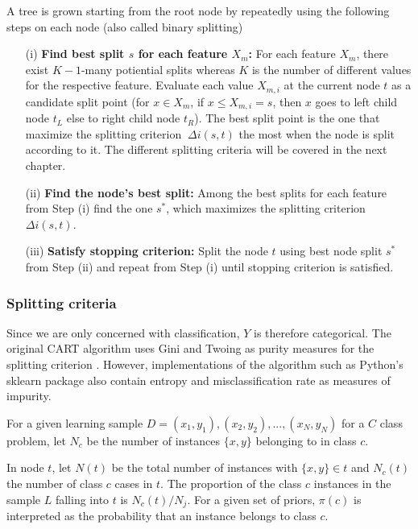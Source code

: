 A tree is grown starting from the root node by repeatedly using the following steps on each
node (also called binary splitting)

\begin{itemize}
    \item[(i)] \textbf{Find best split \(s\) for each feature \(X_{m}\):}
    For each feature \(X_{m}\), there exist \(K-1\)-many potiential splits whereas \(K\) is the number of different values for the respective feature.
    Evaluate each value \(X_{m,i}\) at the current node \(t\) as a candidate split point (for \(x \in X_{m}\), if \(x \leq X_{m,i}=s\),
    then \(x\) goes to left child node \(t_{L}\) else to right child node \(t_{R}\)).
    The best split point is the one that maximize the splitting criterion \(\ \Delta i(s,t) \) the most when the node is split according to it.
    The different splitting criteria will be covered in the next chapter.
    \item[(ii)] \textbf{Find the node’s best split:} Among the best splits for each feature from Step (i) find the one \(s^{*}\), which maximizes the splitting criterion \(\Delta i(s,t)\).
    \item[(iii)] \textbf{Satisfy stopping criterion:} Split the node \(t\) using best node split \(s^{*}\) from Step (ii) and 
    repeat from Step (i) until stopping criterion is satisfied. 
\end{itemize}

\subsubsection{Splitting criteria}
Since we are only concerned with classification, \(Y\) is therefore categorical. The original CART algorithm uses Gini and Twoing as 
purity measures for the splitting criterion \cite{breiman1984classification}. However, implementations of the algorithm
such as Python's sklearn package \cite{scikit2011learn} also contain entropy and misclassification rate as measures of impurity.

For a given learning sample \( D = {(x_{1},y_{1}), (x_{2}, y_{2}), ... , (x_{N}, y_{N})} \) for a \(C\) class problem, let \(N_{c}\) be the number of instances \( \{x,y\}  \)
belonging to in class \(c\).

In node \(t\), let \(N(t)\) be the total number of instances with \( \{x,y\} \in t \) and \( N_{c}(t) \) the number of class \(c\)
cases in \(t\). The proportion of the class \(c\) instances in the sample \(L\) falling into \(t\) is  \( N_{c}(t) / N_{j} \).
For a given set of priors, \( \pi(c) \) is interpreted as the probability that an instance belongs to class \(c\).

